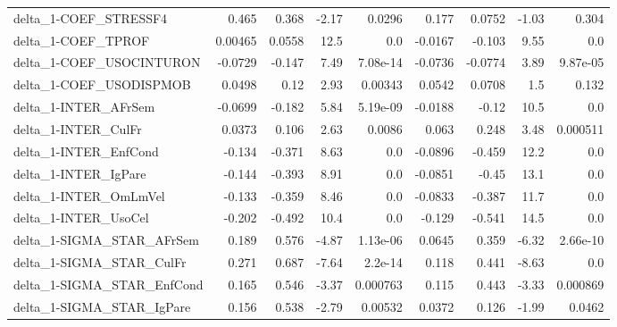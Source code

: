 \begin{tabular}{lrrrrrrrr}
delta\_1-COEF\_STRESSF4                 &       0.465 &        0.368 &   -2.17 &   0.0296 &      0.177 &      0.0752 &        -1.03 &         0.304 \\
delta\_1-COEF\_TPROF                    &     0.00465 &       0.0558 &    12.5 &      0.0 &    -0.0167 &      -0.103 &         9.55 &           0.0 \\
delta\_1-COEF\_USOCINTURON              &     -0.0729 &       -0.147 &    7.49 & 7.08e-14 &    -0.0736 &     -0.0774 &         3.89 &      9.87e-05 \\
delta\_1-COEF\_USODISPMOB               &      0.0498 &         0.12 &    2.93 &  0.00343 &     0.0542 &      0.0708 &          1.5 &         0.132 \\
delta\_1-INTER\_AFrSem                  &     -0.0699 &       -0.182 &    5.84 & 5.19e-09 &    -0.0188 &       -0.12 &         10.5 &           0.0 \\
delta\_1-INTER\_CulFr                   &      0.0373 &        0.106 &    2.63 &   0.0086 &      0.063 &       0.248 &         3.48 &      0.000511 \\
delta\_1-INTER\_EnfCond                 &      -0.134 &       -0.371 &    8.63 &      0.0 &    -0.0896 &      -0.459 &         12.2 &           0.0 \\
delta\_1-INTER\_IgPare                  &      -0.144 &       -0.393 &    8.91 &      0.0 &    -0.0851 &       -0.45 &         13.1 &           0.0 \\
delta\_1-INTER\_OmLmVel                 &      -0.133 &       -0.359 &    8.46 &      0.0 &    -0.0833 &      -0.387 &         11.7 &           0.0 \\
delta\_1-INTER\_UsoCel                  &      -0.202 &       -0.492 &    10.4 &      0.0 &     -0.129 &      -0.541 &         14.5 &           0.0 \\
delta\_1-SIGMA\_STAR\_AFrSem             &       0.189 &        0.576 &   -4.87 & 1.13e-06 &     0.0645 &       0.359 &        -6.32 &      2.66e-10 \\
delta\_1-SIGMA\_STAR\_CulFr              &       0.271 &        0.687 &   -7.64 &  2.2e-14 &      0.118 &       0.441 &        -8.63 &           0.0 \\
delta\_1-SIGMA\_STAR\_EnfCond            &       0.165 &        0.546 &   -3.37 & 0.000763 &      0.115 &       0.443 &        -3.33 &      0.000869 \\
delta\_1-SIGMA\_STAR\_IgPare             &       0.156 &        0.538 &   -2.79 &  0.00532 &     0.0372 &       0.126 &        -1.99 &        0.0462 \\

\end{tabular}
